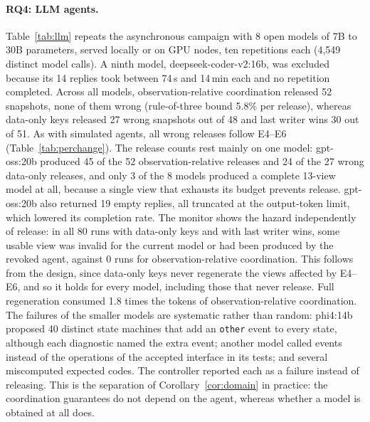 \documentclass[pdflatex,sn-mathphys-num]{sn-jnl}
\theoremstyle{thmstyleone}%
\theoremstyle{thmstyletwo}%
\theoremstyle{thmstylethree}%
\newcommand{\LlmModels}{8}
\newcommand{\LlmCalls}{4,549}
\newcommand{\LlmExactReleases}{52}
\newcommand{\LlmDataReleases}{48}
\newcommand{\LlmDataWrong}{27}
\newcommand{\LlmLwwReleases}{51}
\newcommand{\LlmLwwWrong}{30}
\newcommand{\LlmTokenRatio}{1.8}
\newcommand{\LlmExactStale}{0}
\newcommand{\LlmRunsPerStrategy}{80}
\newcommand{\LlmTopModel}{gpt-oss:20b}
\newcommand{\LlmTopExactReleases}{45}
\newcommand{\LlmTopDataWrong}{24}
\newcommand{\LlmModelsWithRelease}{3}
\newcommand{\LlmOtherModel}{phi4:14b}
\newcommand{\LlmOtherCalls}{40}
\newcommand{\LlmTopEmpty}{19}
\newcommand{\LlmExactBound}{5.8}
\newcommand{\LlmExcludedCalls}{14}
\newcommand{\LlmExcludedMaxMin}{14}
\newcommand{\LlmExcludedMinS}{74}
\begin{document}
\paragraph{RQ4: LLM agents.} Table~\ref{tab:llm} repeats the asynchronous campaign with \LlmModels{} open models of 7B to 30B parameters, served locally or on GPU nodes, ten repetitions each (\LlmCalls{} distinct model calls). A ninth model, deepseek-coder-v2:16b, was excluded because its \LlmExcludedCalls{} replies took between \LlmExcludedMinS\,s and \LlmExcludedMaxMin\,min each and no repetition completed. Across all models, observation-relative coordination released \LlmExactReleases{} snapshots, none of them wrong (rule-of-three bound \LlmExactBound\% per release), whereas data-only keys released \LlmDataWrong{} wrong snapshots out of \LlmDataReleases{} and last writer wins \LlmLwwWrong{} out of \LlmLwwReleases{}. As with simulated agents, all wrong releases follow E4--E6 (Table~\ref{tab:perchange}). The release counts rest mainly on one model: \LlmTopModel{} produced \LlmTopExactReleases{} of the \LlmExactReleases{} observation-relative releases and \LlmTopDataWrong{} of the \LlmDataWrong{} wrong data-only releases, and only \LlmModelsWithRelease{} of the \LlmModels{} models produced a complete 13-view model at all, because a single view that exhausts its budget prevents release. \LlmTopModel{} also returned \LlmTopEmpty{} empty replies, all truncated at the output-token limit, which lowered its completion rate. The monitor shows the hazard independently of release: in all \LlmRunsPerStrategy{} runs with data-only keys and with last writer wins, some usable view was invalid for the current model or had been produced by the revoked agent, against \LlmExactStale{} runs for observation-relative coordination. This follows from the design, since data-only keys never regenerate the views affected by E4--E6, and so it holds for every model, including those that never release. Full regeneration consumed \LlmTokenRatio{} times the tokens of observation-relative coordination. The failures of the smaller models are systematic rather than random: \LlmOtherModel{} proposed \LlmOtherCalls{} distinct state machines that add an \texttt{other} event to every state, although each diagnostic named the extra event; another model called events instead of the operations of the accepted interface in its tests; and several miscomputed expected codes. The controller reported each as a failure instead of releasing. This is the separation of Corollary~\ref{cor:domain} in practice: the coordination guarantees do not depend on the agent, whereas whether a model is obtained at all does.
\end{document}
